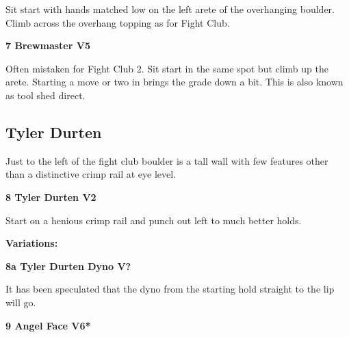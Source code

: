 \begin{multicols}{2}
\begin{minipage}{\linewidth}
					\begin{adjustwidth}{0.5cm}{}				
					Sit start with hands matched low on the left arete of the overhanging boulder. Climb across the overhang topping as for Fight Club.
					\end{adjustwidth}
					\end{minipage}
					\begin{minipage}{\linewidth}	
					\label{rt:Brewmaster}
\colorbox{RoyalBlue!20}{
\parbox{0.95\textwidth}{
\textbf{
7 Brewmaster V5    
}
}
}

					\begin{adjustwidth}{0.5cm}{}				
					Often mistaken for Fight Club 2. Sit start in the same spot but climb up the arete. Starting a move or two in brings the grade down a bit. This is also known as tool shed direct.
					\end{adjustwidth}
					\end{minipage}
			\begin{minipage}{\columnwidth}
			\subsection*{Tyler Durten}\label{bf:Tyler Durten}
			Just to the left of the fight club boulder is a tall wall with few features other than a distinctive crimp rail at eye level.
			
			\end{minipage}
			
					\begin{minipage}{\linewidth}	
					\label{rt:Tyler Durten}
\colorbox{green!20}{
\parbox{0.95\textwidth}{
\textbf{
8 Tyler Durten V2   
}
}
}

					\begin{adjustwidth}{0.5cm}{}				
					Start on a henious crimp rail and punch out left to much better holds.
					\end{adjustwidth}
					\end{minipage}
						\begin{adjustwidth}{0.5cm}{}				
						\textbf{Variations:} \newline
							\begin{minipage}{\linewidth}	
							\label{vr:Tyler Durten Dyno}
\colorbox{black!20}{
\parbox{0.95\textwidth}{
\textbf{
8a Tyler Durten Dyno V?  
}
}
}

							\begin{adjustwidth}{0.5cm}{}				
							It has been speculated that the dyno from the starting hold straight to the lip will go.
							\end{adjustwidth}
							\end{minipage}
						\end{adjustwidth}
					\begin{minipage}{\linewidth}	
					\label{rt:Angel Face}
\colorbox{RoyalBlue!20}{
\parbox{0.95\textwidth}{
\textbf{
9 Angel Face V6*  
}
}
}


\end{minipage}
\end{multicols}

